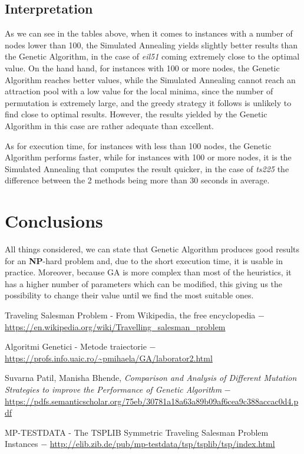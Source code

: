 \documentclass[a4paper]{article}
\begin{document}
\subsection{Interpretation}

As we can see in the tables above, when it comes to instances with a number of nodes lower than 100, the Simulated Annealing yields slightly better results than the Genetic Algorithm, in the case of \textit{eil51} coming extremely close to the optimal value. On the hand hand, for instances with 100 or more nodes, the Genetic Algorithm reaches better values, while the Simulated Annealing cannot reach an attraction pool with a low value for the local minima, since the number of permutation is extremely large, and the greedy strategy it follows is unlikely to find close to optimal results. However, the results yielded by the Genetic Algorithm in this case are rather adequate than excellent.

As for execution time, for instances with less than 100 nodes, the Genetic Algorithm performs faster, while for instances with 100 or more nodes, it is the Simulated Annealing that computes the result quicker, in the case of \textit{ts225} the difference between the 2 methods being more than 30 seconds in average.

\section{Conclusions}

All things considered, we can state that Genetic Algorithm produces good results for an \textbf{NP}-hard problem and, due to the short execution time, it is usable in practice. Moreover, because GA is more complex than most of the heuristics, it has a higher number of parameters which can be modified, this giving us the possibility to change their value until we find the most suitable ones. 

\begin{thebibliography}{9}

	Traveling Salesman Problem - From Wikipedia, the free encyclopedia $-$
	\url{https://en.wikipedia.org/wiki/Travelling_salesman_problem}

	Algoritmi Genetici - Metode traiectorie $-$
	\url{https://profs.info.uaic.ro/~pmihaela/GA/laborator2.html}

	Suvarna Patil, Manisha Bhende, {\itshape Comparison and Analysis of Different Mutation Strategies to improve the Performance of Genetic Algorithm} $-$
	\url{https://pdfs.semanticscholar.org/75eb/30781a18a63a89b09af6cea9c388accac0d4.pdf}

	MP-TESTDATA - The TSPLIB Symmetric Traveling Salesman Problem Instances $-$
	\url{http://elib.zib.de/pub/mp-testdata/tsp/tsplib/tsp/index.html}


	\end{thebibliography}
\end{document}
